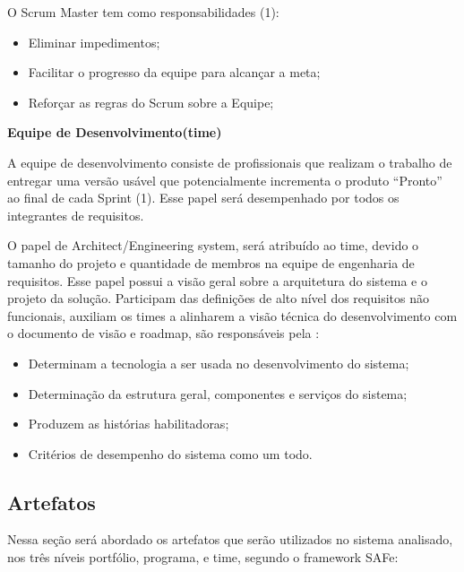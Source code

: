 \begin{description}
O Scrum Master tem como responsabilidades (1):
\begin{itemize}
    \item Eliminar impedimentos;
    \item Facilitar o progresso da equipe para alcançar a meta;
    \item Reforçar as regras do Scrum sobre a Equipe;
\end{itemize}

\item \textbf{Equipe de Desenvolvimento(time)}

A equipe de desenvolvimento consiste de profissionais que realizam o trabalho de entregar uma versão usável que potencialmente incrementa o produto “Pronto” ao final de cada Sprint (1). Esse papel será desempenhado por todos os integrantes de requisitos.

O papel de Architect/Engineering system, será atribuído ao time, devido o tamanho do projeto e quantidade de membros na equipe de engenharia de requisitos. Esse papel possui a visão geral sobre a arquitetura do sistema e o projeto da solução. Participam das definições de alto nível dos requisitos não funcionais, auxiliam os times a alinharem a visão técnica do desenvolvimento com o documento de visão e roadmap, são responsáveis pela \cite{safe}:
\begin{itemize}
    \item Determinam a tecnologia a ser usada no desenvolvimento do sistema;
    \item Determinação da estrutura geral, componentes e serviços do sistema;
    \item Produzem as histórias habilitadoras;
    \item Critérios de desempenho do sistema como um todo.
\end{itemize}
\end{description}

\subsection{Artefatos}\label{processoArtefatos}

Nessa seção será abordado os artefatos que serão utilizados no sistema analisado, nos três níveis portfólio, programa, e time, segundo o framework SAFe:

